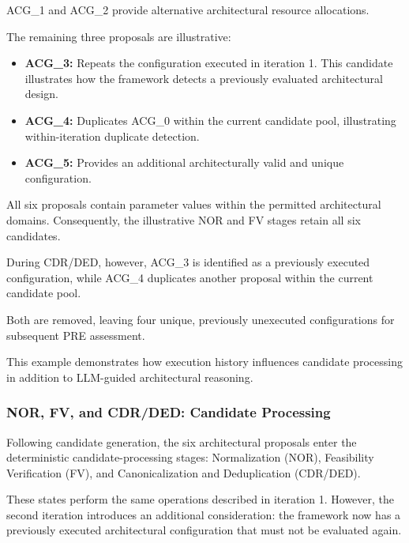 ACG\_1 and ACG\_2 provide alternative
architectural resource allocations.

The remaining three proposals are illustrative:

\begin{itemize}

\item \textbf{ACG\_3:}
Repeats the configuration executed in
iteration 1. This candidate illustrates
how the framework detects a previously
evaluated architectural design.

\item \textbf{ACG\_4:}
Duplicates ACG\_0 within the current
candidate pool, illustrating
within-iteration duplicate detection.

\item \textbf{ACG\_5:}
Provides an additional architecturally
valid and unique configuration.

\end{itemize}

All six proposals contain parameter values
within the permitted architectural domains.
Consequently, the illustrative NOR and FV
stages retain all six candidates.

During CDR/DED, however, ACG\_3 is identified
as a previously executed configuration,
while ACG\_4 duplicates another proposal
within the current candidate pool.

Both are removed, leaving four unique,
previously unexecuted configurations
for subsequent PRE assessment.

This example demonstrates how execution
history influences candidate processing
in addition to LLM-guided architectural
reasoning.


\subsubsection{NOR, FV, and CDR/DED: Candidate Processing}
\label{app:illustrative_processing2}

Following candidate generation, the six
architectural proposals enter the deterministic
candidate-processing stages: Normalization (NOR),
Feasibility Verification (FV), and
Canonicalization and Deduplication (CDR/DED).

These states perform the same operations
described in iteration 1. However, the
second iteration introduces an additional
consideration: the framework now has a
previously executed architectural configuration
that must not be evaluated again.

